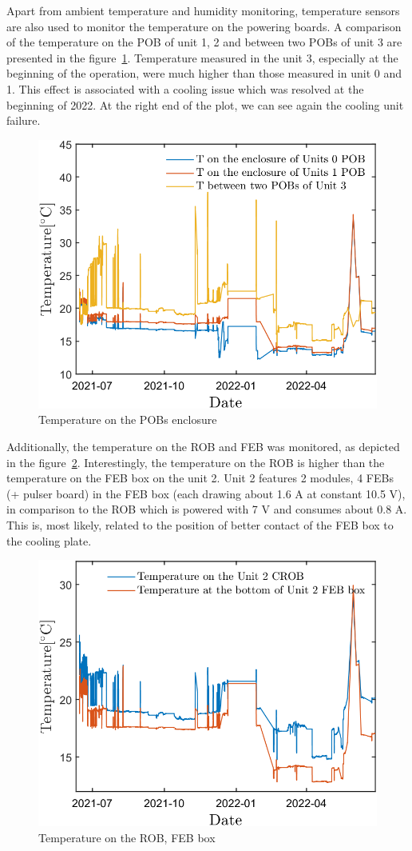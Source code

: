 Apart from ambient temperature and humidity monitoring, temperature sensors are also used to monitor the temperature on the powering boards. A comparison of the temperature on the \gls{POB} of unit 1, 2 and between two POBs of unit 3 are presented in the figure~\ref{fig_POB1}. Temperature measured in the unit 3, especially at the beginning of the operation, were much higher than those measured in unit 0 and 1. This effect is associated with a cooling issue which was resolved at the beginning of 2022. At the right end of the plot, we can see again the cooling unit failure. 
\begin{figure}[!h]
\centering
\includegraphics[width=0.55\columnwidth]{Chapter6/DCS/images/POB1.png}
\caption{Temperature on the POBs enclosure}
\label{fig_POB1}
\end{figure}
\newpage
Additionally, the temperature on the \gls{ROB} and \gls{FEB} was monitored, as depicted in the figure~\ref{fig_robvsfeb}. Interestingly, the temperature on the \gls{ROB} is higher than the temperature on the \gls{FEB} box on the unit 2. Unit 2 features 2 modules, 4 \gls{FEB}s (+ pulser board) in the \gls{FEB} box (each drawing about 1.6 A at constant 10.5 V), in comparison to the \gls{ROB} which is powered with 7 V and consumes about 0.8 A. This is, most likely, related to the position of better contact of the \gls{FEB} box to the cooling plate.

\begin{figure}[!h]
\centering
\includegraphics[width=0.55\columnwidth]{Chapter6/DCS/images/ROBvsFEB.png}
\caption{Temperature on the \gls{ROB}, \gls{FEB} box}
\label{fig_robvsfeb}
\end{figure}

